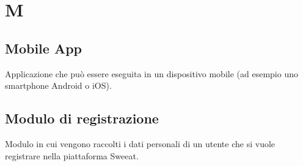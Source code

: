 \section{M}

\subsection{Mobile App} Applicazione che può essere eseguita in un dispositivo mobile (ad esempio uno smartphone Android o iOS).

\subsection{Modulo di registrazione} Modulo in cui vengono raccolti i dati personali di un utente che si vuole registrare nella piattaforma Sweeat.

\clearpage